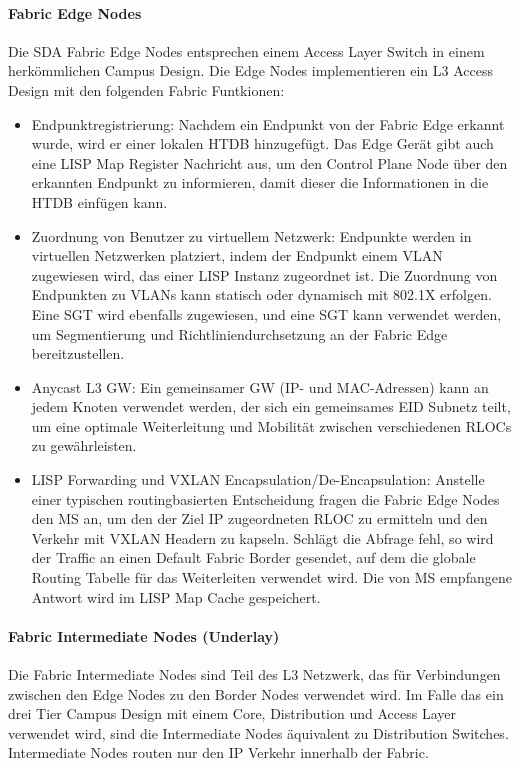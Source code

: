 \paragraph{Fabric Edge Nodes}
Die SDA Fabric Edge Nodes entsprechen einem Access Layer Switch in einem herkömmlichen Campus Design. Die Edge Nodes implementieren ein L3 Access Design mit den folgenden Fabric Funtkionen: \cite{sda-designguide}
\begin{itemize}	
	\item Endpunktregistrierung: Nachdem ein Endpunkt von der Fabric Edge erkannt wurde, wird er einer lokalen HTDB hinzugefügt. Das Edge Gerät gibt auch eine LISP Map Register Nachricht aus, um den Control Plane Node über den erkannten Endpunkt zu informieren, damit dieser die Informationen in die HTDB einfügen kann.
	\item Zuordnung von Benutzer zu virtuellem Netzwerk: Endpunkte werden in virtuellen Netzwerken platziert, indem der Endpunkt einem VLAN zugewiesen wird, das einer LISP Instanz zugeordnet ist. Die Zuordnung von Endpunkten zu VLANs kann statisch oder dynamisch mit 802.1X erfolgen. Eine SGT wird ebenfalls zugewiesen, und eine SGT kann verwendet werden, um Segmentierung und Richtliniendurchsetzung an der Fabric Edge bereitzustellen.
	\item Anycast L3 GW: Ein gemeinsamer GW (IP- und MAC-Adressen) kann an jedem Knoten verwendet werden, der sich ein gemeinsames EID Subnetz teilt, um eine optimale Weiterleitung und Mobilität zwischen verschiedenen RLOCs zu gewährleisten.
	\item LISP Forwarding und VXLAN Encapsulation/De-Encapsulation: Anstelle einer typischen routingbasierten Entscheidung fragen die Fabric Edge Nodes den MS an, um den der Ziel IP zugeordneten RLOC zu ermitteln und den Verkehr mit VXLAN Headern zu kapseln. Schlägt die Abfrage fehl, so wird der Traffic an einen Default Fabric Border gesendet, auf dem die globale Routing Tabelle für das Weiterleiten verwendet wird. Die von MS empfangene Antwort wird im LISP Map Cache gespeichert. 
\end{itemize} 

\paragraph{Fabric Intermediate Nodes (Underlay)}
Die Fabric Intermediate Nodes sind Teil des L3 Netzwerk, das für Verbindungen zwischen den Edge Nodes zu den Border Nodes verwendet wird. Im Falle das ein drei Tier Campus Design mit einem Core, Distribution und Access Layer verwendet wird, sind die  Intermediate Nodes äquivalent zu Distribution Switches. Intermediate Nodes routen nur den IP Verkehr innerhalb der Fabric. \cite{sda-designguide}

